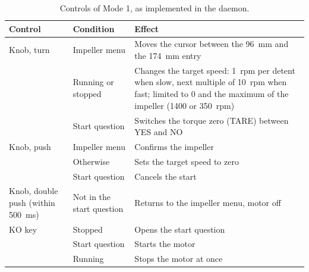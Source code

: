 \begin{table}[htbp]
    \centering
    \caption[Controls of the standalone interface]{Controls of Mode 1, as implemented in the daemon.}
    \label{tab:mode1-controls}
    \small
    \begin{tabular}{@{}p{3.2cm}p{3.6cm}p{6.2cm}@{}}
        \toprule
        Control & Condition & Effect \\
        \midrule
        Knob, turn & Impeller menu & Moves the cursor between the 96~mm and the 174~mm entry \\
        & Running or stopped & Changes the target speed: 1~rpm per detent when slow, next multiple of 10~rpm when fast; limited to 0 and the maximum of the impeller (1400 or 350~rpm) \\
        & Start question & Switches the torque zero (TARE) between YES and NO \\
        Knob, push & Impeller menu & Confirms the impeller \\
        & Otherwise & Sets the target speed to zero \\
        & Start question & Cancels the start \\
        Knob, double push (within 500~ms) & Not in the start question & Returns to the impeller menu, motor off \\
        KO key & Stopped & Opens the start question \\
        & Start question & Starts the motor \\
        & Running & Stops the motor at once \\
        \bottomrule
    \end{tabular}
\end{table}

